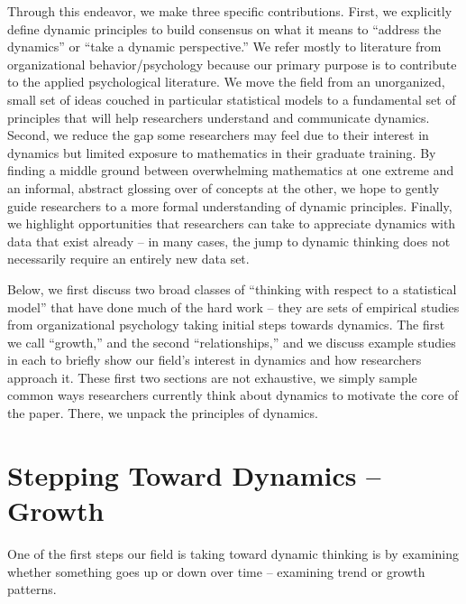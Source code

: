 \documentclass[english,,man]{apa6}
\theoremstyle{definition}
\theoremstyle{definition}
\theoremstyle{definition}
\theoremstyle{remark}
\begin{document}
Through this endeavor, we make three specific contributions. First, we
explicitly define dynamic principles to build consensus on what it means
to \enquote{address the dynamics} or \enquote{take a dynamic
perspective.} We refer mostly to literature from organizational
behavior/psychology because our primary purpose is to contribute to the
applied psychological literature. We move the field from an unorganized,
small set of ideas couched in particular statistical models to a
fundamental set of principles that will help researchers understand and
communicate dynamics. Second, we reduce the gap some researchers may
feel due to their interest in dynamics but limited exposure to
mathematics in their graduate training. By finding a middle ground
between overwhelming mathematics at one extreme and an informal,
abstract glossing over of concepts at the other, we hope to gently guide
researchers to a more formal understanding of dynamic principles.
Finally, we highlight opportunities that researchers can take to
appreciate dynamics with data that exist already -- in many cases, the
jump to dynamic thinking does not necessarily require an entirely new
data set.

Below, we first discuss two broad classes of \enquote{thinking with
respect to a statistical model} that have done much of the hard work --
they are sets of empirical studies from organizational psychology taking
initial steps towards dynamics. The first we call \enquote{growth,} and
the second \enquote{relationships,} and we discuss example studies in
each to briefly show our field's interest in dynamics and how
researchers approach it. These first two sections are not exhaustive, we
simply sample common ways researchers currently think about dynamics to
motivate the core of the paper. There, we unpack the principles of
dynamics.

\hypertarget{stepping-toward-dynamics-growth}{%
\section{Stepping Toward Dynamics --
Growth}\label{stepping-toward-dynamics-growth}}

One of the first steps our field is taking toward dynamic thinking is by
examining whether something goes up or down over time -- examining trend
or growth patterns.
\end{document}
